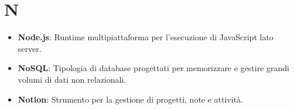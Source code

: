 \section{N}
\begin{itemize}
    \item \textbf{Node.js}: Runtime multipiattaforma per l'esecuzione di JavaScript lato server.
        \item \textbf{NoSQL}: Tipologia di database progettati per memorizzare e gestire grandi volumi di dati non relazionali.
    \item \textbf{Notion}: Strumento per la gestione di progetti, note e attività.

\end{itemize}
